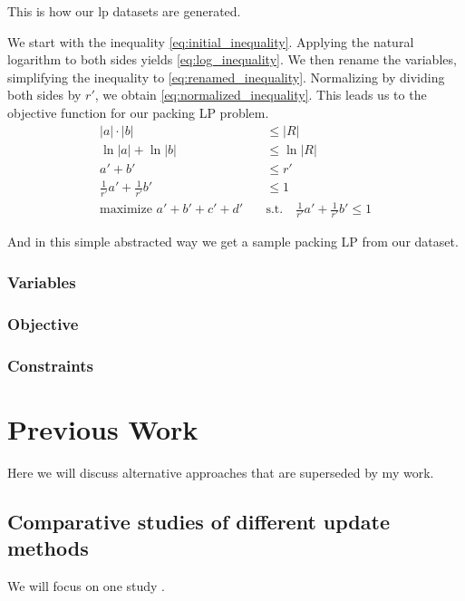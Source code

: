 This is how our \gls{lp} datasets are generated.

We start with the inequality \ref{eq:initial_inequality}. Applying the natural logarithm to both sides yields \ref{eq:log_inequality}. We then rename the variables, simplifying the inequality to \ref{eq:renamed_inequality}.
Normalizing by dividing both sides by \(r'\), we obtain \ref{eq:normalized_inequality}. This leads us to the objective function for our packing LP problem.
\begin{align}
    |a| \cdot |b|                            & \leq |R| \label{eq:initial_inequality}                                                   \\
    \ln|a| + \ln|b|                          & \leq \ln|R| \label{eq:log_inequality}                                                    \\
    a' + b'                                  & \leq r' \label{eq:renamed_inequality}                                                    \\
    \frac{1}{r'} a' + \frac{1}{r'} b'        & \leq 1 \label{eq:normalized_inequality}                                                  \\
    \text{maximize } a' + b' + c' + d' \quad & \text{s.t.} \quad \frac{1}{r'} a' + \frac{1}{r'} b' \leq 1 \label{eq:objective_function}
\end{align}

And in this simple abstracted way we get a sample packing LP from our dataset.
\subsubsection{Variables}
\subsubsection{Objective}
\subsubsection{Constraints}

\section{Previous Work}
Here we will discuss alternative approaches that are superseded by my work.
\subsection{Comparative studies of different update methods}
We will focus on one study \parencite{huangfu2015novel}.
